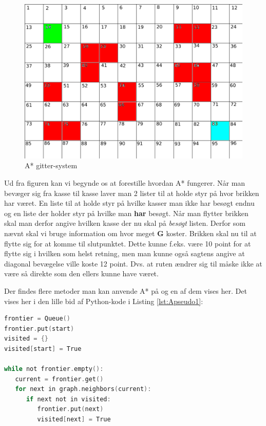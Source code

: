\begin{figure}[ht!]
\begin{adjustbox}{width=1.2\textwidth,center=\textwidth}
\centering
\includegraphics[width=1.2\textwidth]{Pictures/Teoriafsnit/Figurfiler/Grid2.png}
\end{adjustbox}
\label{fig:AKvadrat1}
\caption{A* gitter-system}
\end{figure}

Ud fra figuren kan vi begynde os at forestille hvordan A* fungerer. Når man bevæger sig fra kasse til kasse laver man 2 lister til at holde styr på hvor brikken har været. En liste til at holde styr på hvilke kasser man ikke har besøgt endnu og en liste der holder styr på hvilke man \textbf{har} besøgt. Når man flytter brikken skal man derfor angive hvilken kasse der nu skal på \textit{besøgt} listen. Derfor som nævnt skal vi bruge information om hvor meget \textbf{G} koster. Brikken skal nu til at flytte sig for at komme til slutpunktet. Dette kunne f.eks. være 10 point for at flytte sig i hvilken som helst retning, men man kunne også sagtens angive at diagonal bevægelse ville koste 12 point. Dvs. at ruten ændrer sig til måske ikke at være så direkte som den ellers kunne have været.

Der findes flere metoder man kan anvende A* på og en af dem vises her.
Det vises her i den lille bid af Python-kode i Listing \ref{lst:Apseudo1}:
\begin{lstlisting}[caption={A stjerne og pseudo-kode af brug af lister},label={lst:Apseudo1},language=C]
frontier = Queue()
frontier.put(start)
visited = {}
visited[start] = True

while not frontier.empty():
   current = frontier.get()
   for next in graph.neighbors(current):
      if next not in visited:
         frontier.put(next)
         visited[next] = True
\end{lstlisting}
\cite{stanfordredblobgamesAstar}

